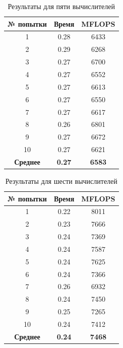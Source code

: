 \begin{table}[H]
	\caption{Результаты для пяти вычислителей}
	\centering
	\begin{tabular}{|c|c|c|}
		\hline
		\textbf{№ попытки} & \textbf{Время} & \textbf{MFLOPS} \\\hline
		1 & 0.28 & 6433 \\ \hline
		2 & 0.29 & 6268 \\ \hline
		3 & 0.27 & 6700 \\ \hline
		4 & 0.27 & 6552 \\ \hline
		5 & 0.27 & 6613 \\ \hline
		6 & 0.27 & 6550 \\ \hline
		7 & 0.27 & 6617 \\ \hline
		8 & 0.26 & 6801 \\ \hline
		9 & 0.27 & 6672 \\ \hline
		10 & 0.27 & 6621 \\ \hline
		\textbf{Среднее} & \textbf{0.27} & \textbf{6583} \\\hline
	\end{tabular}
	\label{res/05}
\end{table}


\begin{table}[H]
	\caption{Результаты для шести вычислителей}
	\centering
	\begin{tabular}{|c|c|c|}
		\hline
		\textbf{№ попытки} & \textbf{Время} & \textbf{MFLOPS} \\\hline
		1 & 0.22 & 8011 \\ \hline
		2 & 0.23 & 7666 \\ \hline
		3 & 0.24 & 7369 \\ \hline
		4 & 0.24 & 7587 \\ \hline
		5 & 0.24 & 7625 \\ \hline
		6 & 0.24 & 7366 \\ \hline
		7 & 0.26 & 6932 \\ \hline
		8 & 0.24 & 7450 \\ \hline
		9 & 0.25 & 7265 \\ \hline
		10 & 0.24 & 7412 \\ \hline
		\textbf{Среднее} & \textbf{0.24} & \textbf{7468} \\\hline
	\end{tabular}
	\label{res/06}
\end{table}



